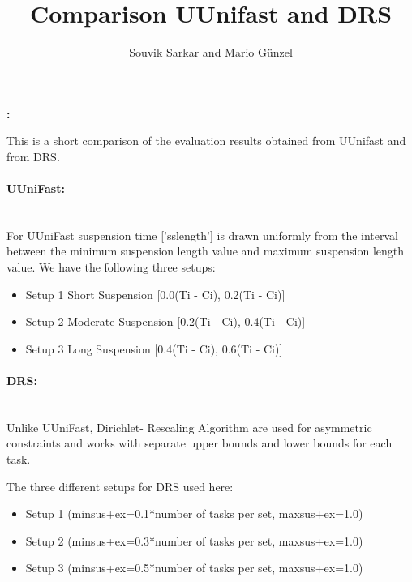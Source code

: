\documentclass[]{article}
\title{\vspace{0.0001mm}Comparison UUnifast and DRS}
\author{Souvik Sarkar and Mario Günzel}
\renewenvironment{abstract}
 {\par\noindent\textbf{\abstractname:}\ \ignorespaces}
 {\par\medskip}
\begin{document}
	
	\maketitle
	
	\begin{abstract}
 
{
\raggedleft This is a short comparison of the evaluation results obtained from UUnifast and from DRS.
}
	\end{abstract}
 
\paragraph{UUniFast:} \hspace{0pt} \\

{\raggedleft For UUniFast suspension time ['sslength'] is drawn uniformly from the interval between the minimum suspension length value and maximum suspension length value. We have the following three setups:
}
 
 \begin{itemize}
		\item Setup 1 Short Suspension [0.0(Ti - Ci), 0.2(Ti - Ci)]
		\item Setup 2 Moderate Suspension [0.2(Ti - Ci), 0.4(Ti - Ci)]
		\item Setup 3 Long Suspension [0.4(Ti - Ci), 0.6(Ti - Ci)]
\end{itemize}



\paragraph{DRS:} \hspace{0pt} \\

{\raggedleft 
Unlike UUniFast, Dirichlet- Rescaling Algorithm are used for asymmetric constraints and works with separate upper bounds and lower bounds for each task. 
}

The three different setups for DRS used here:
	
	\begin{itemize}
		\item Setup 1 (minsus+ex=0.1*number of tasks per set, maxsus+ex=1.0)
		\item Setup 2 (minsus+ex=0.3*number of tasks per set, maxsus+ex=1.0)
		\item Setup 3 (minsus+ex=0.5*number of tasks per set, maxsus+ex=1.0)
	\end{itemize}
\end{document}
